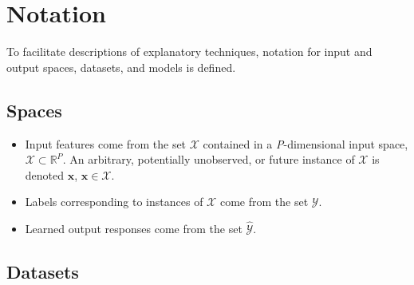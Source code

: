 \documentclass[sigconf, review]{acmart}
\begin{document}
\section{Notation} \label{sec:notation}

To facilitate descriptions of explanatory techniques, notation for input and output spaces, datasets, and models is defined.

\subsection{Spaces} 
 
	\begin{itemize}
		\item Input features come from the set $\mathcal{X}$ contained in a \textit{P}-dimensional input space, $\mathcal{X} \subset \mathbb{R}^P$.  An arbitrary, potentially unobserved, or future instance of $\mathcal{X}$ is denoted $\mathbf{x}$, $\mathbf{x} \in \mathcal{X}$.
		\item Labels corresponding to instances of $\mathcal{X}$ come from the set $\mathcal{Y}$.
		\item Learned output responses come from the set $\mathcal{\hat{Y}}$. %
	\end{itemize}	
	
\subsection{Datasets} 
\end{document}
